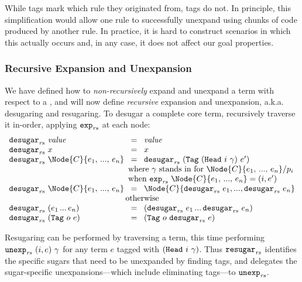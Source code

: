 While {\MacHeadf} tags mark which rule they originated from, {\MacBodyf}
tags do not. In principle, this
simplification would allow one rule to successfully unexpand using chunks
of code produced by another rule. In practice, it is hard to construct
scenarios in which this actually occurs and, in any case, it does not
affect our goal properties.

\subsubsection{Recursive Expansion and Unexpansion}
\label{sec:reval-expansion}

We have defined how to \emph{non-recursively} expand and unexpand a term
with respect to a {}, and will now define \emph{recursive}
expansion and unexpansion, a.k.a. desugaring and resugaring.
To desugar a complete core term,
recursively traverse it in-order,
applying $\texttt{exp}_{\mathit{rs}}$ at each node:
\[\begin{array}{lcl}
\ExpandRec{\Value} \!&=&\! \Value \\
\ExpandRec{\VarX} \!&=&\! \VarX \\
\ExpandRec{\Node{C}{e_1,\,...,\,e_n}} \!&=&\!
  \ExpandRec{\Tag{\MacHead{i}{\gamma}}{e'}} \\
  & \multicolumn{2}{l}{\text{
\hspace{-1em} where $\gamma$ stands in for $\Node{C}{e_1,\,...,\,e_n} \match p_i$}} \\
  & \multicolumn{2}{l}{\text{
\hspace{-1em} when $\Expand{\Node{C}{e_1,\,...,\,e_n}} = (i, e')$}} \\
\ExpandRec{\Node{C}{e_1,\,...,\,e_n}} \!&=&\!
  \Node{C}{\ExpandRec{e_1},...,\ExpandRec{e_n}} \\
& \multicolumn{2}{l}{\text{\hspace{-1em} otherwise}} \\
\ExpandRec{(e_1\,...\,e_n)} \!&=&\!
  (\ExpandRec{e_1}\,...\,\ExpandRec{e_n}) \\
\ExpandRec{\Tag{o}{e}} \!&=&\!
  \Tag{o}{\ExpandRec{e}}
\end{array}\]

Resugaring can be performed by traversing a term, this
time performing \\ %
$\texttt{unexp}_{\mathit{rs}}\ {(i, e)}\ {\gamma}$ for any term $e$ tagged with
$(\texttt{Head}\ i\ \gamma)$. Thus $\textnormal{\texttt{resugar}}_{\mathit{rs}}$ identifies the specific sugars
that need to be unexpanded by finding {\MacHeadf} tags, and delegates the
sugar-specific unexpansions---which include eliminating {\MacBodyf}
tags---to $\textnormal{\texttt{unexp}}_{\mathit{rs}}$.

